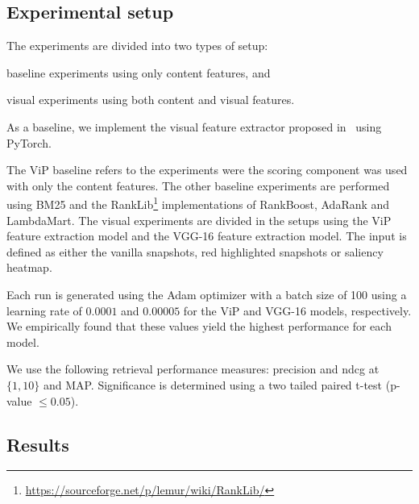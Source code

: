 \subsection{Experimental setup}
The experiments are divided into two types of setup:
\begin{inparaenum}[(i)]
\item baseline experiments using only content features, and
\item visual experiments using both content and visual features.
\end{inparaenum}


As a baseline, we implement the visual feature extractor proposed in~\citet{fan2017learning} using PyTorch.

The ViP baseline refers to the experiments were the scoring component was used with only the content features. The other baseline experiments are performed using BM25 and the RankLib\footnote{\url{https://sourceforge.net/p/lemur/wiki/RankLib/}} implementations of RankBoost, AdaRank and LambdaMart.
The visual experiments are divided in the setups using the ViP feature extraction model and the VGG-16 feature extraction model. The input is defined as either the vanilla snapshots, red highlighted snapshots or saliency heatmap. 

Each run is generated using the Adam optimizer with a batch size of 100 using a learning rate of $0.0001$ and $0.00005$ for the ViP and VGG-16 models, respectively. We empirically found that these values yield the highest performance for each model.

We use the following retrieval performance measures: precision and ndcg at $\{1,10\}$ and MAP.
Significance is determined using a two tailed paired t-test (p-value $\leq 0.05$). 

\subsection{Results}


